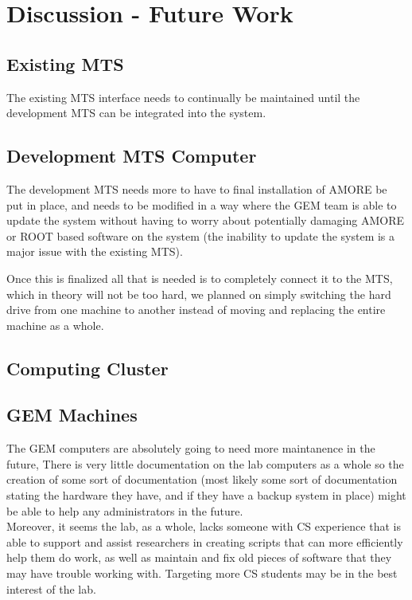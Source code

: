 \documentclass[12pt]{article}
\newcommand\tab[1][1cm]{\hspace*{#1}}
\begin{document}
\section{Discussion - Future Work}

\subsection{Existing MTS}

\tab The existing MTS interface needs to continually be maintained until the development MTS can be integrated into the system. 

\subsection{Development MTS Computer}

\tab The development MTS needs more to have to final installation of AMORE be put in place, and 
needs to be modified in a way where the GEM team is able to update the system without having to
worry about potentially damaging AMORE or ROOT based software on the system (the inability to
update the system is a major issue with the existing MTS). 

\tab Once this is finalized all that is needed is to completely connect it to the MTS, which 
in theory will not be too hard, we planned on simply switching the hard drive from one machine
to another instead of moving and replacing the entire machine as a whole. 

\subsection{Computing Cluster}

\tab 

\subsection{GEM Machines}

\tab The GEM computers are absolutely going to need more maintanence in the future, There is very
little documentation on the lab computers as a whole so the creation of some sort of documentation
(most likely some sort of documentation stating the hardware they have, and if they have a backup
system in place) might be able to help any administrators in the future. \\
\tab Moreover, it seems the lab, as a whole, lacks someone with CS experience that is able to
support and assist researchers in creating scripts that can more efficiently help them do work,
as well as maintain and fix old pieces of software that they may have trouble working with. Targeting more CS students may be in the best interest of the lab. 
\end{document}
